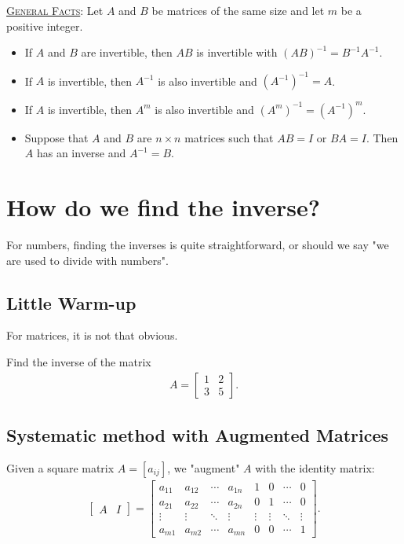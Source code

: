 \documentclass[12pt,a4paper]{article}
\newcounter{example}[section]
\begin{document}
\vfill

\noindent \underline{\textsc{General Facts}}: Let $A$ and $B$ be matrices of the same size and let $m$ be a positive integer.
	\begin{itemize}
	\item If $A$ and $B$ are invertible, then $AB$ is invertible with $(AB)^{-1} = B^{-1} A^{-1}$.
	\item If $A$ is invertible, then $A^{-1}$ is also invertible and $(A^{-1})^{-1} = A$.
	\item If $A$ is invertible, then $A^m$ is also invertible and $(A^m)^{-1} = (A^{-1})^m$.
	\end{itemize}
	\begin{itemize}
	\item Suppose that $A$ and $B$ are $n \times n$ matrices such that $AB = I$ or $BA = I$. Then $A$ has an inverse and $A^{-1} = B$.
	\end{itemize}

\newpage

\section{How do we find the inverse?}

For numbers, finding the inverses is quite straightforward, or should we say "we are used to divide with numbers". 

\subsection{Little Warm-up}
For matrices, it is not that obvious.

\vspace*{16pt}

	\begin{example}
	Find the inverse of the matrix
		\begin{align*}
		A = \begin{bmatrix}
		1 & 2 \\ 3 & 5
		\end{bmatrix} .
		\end{align*}
	\end{example}
	
\newpage
	
\subsection{Systematic method with Augmented Matrices}
Given a square matrix $A = [a_{ij}]$, we "augment" $A$ with the identity matrix:
	\begin{align*}
	\begin{bmatrix}
	A & I
	\end{bmatrix}
	=
	\begin{bmatrix}
	a_{11} & a_{12} & \cdots & a_{1n} & 1 & 0 & \cdots & 0 \\
	a_{21} & a_{22} & \cdots & a_{2n} & 0 & 1 & \cdots & 0 \\
	\vdots & \vdots & \ddots & \vdots & \vdots & \vdots & \ddots & \vdots \\
	a_{m1} & a_{m2} & \cdots & a_{mn} & 0 & 0 & \cdots & 1
	\end{bmatrix} .
	\end{align*}
	
\end{document}
